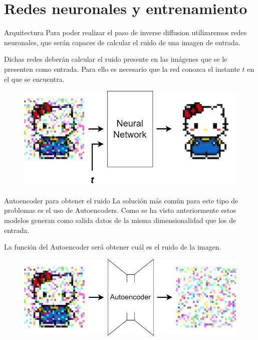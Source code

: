 \section{Redes neuronales y entrenamiento}

\begin{frame}{Arquitectura}
Para poder realizar el paso de \alert{inverse diffusion} utilizaremos redes neuronales, que serán capaces de calcular el \alert{ruido} de una imagen de entrada.

Dichas redes deberán calcular el \alert{ruido} presente en las imágenes que se le presenten como entrada. Para ello es necesario que la red conozca el instante \alert{$t$} en el que se encuentra.

\begin{figure}
    \centering
    \includegraphics[width=\textwidth]{figures/Diffusion_Models/Architecture.png}
\end{figure}
\end{frame}

\begin{frame}{Autoencoder para obtener el ruido}
La solución más común para este tipo de problemas es el uso de \alert{Autoencoders}. Como se ha visto anteriormente estos modelos generan como salida datos de la misma \alert{dimensionalidad} que los de entrada.

La función del Autoencoder será obtener cuál es el \alert{ruido} de la imagen.

\begin{figure}
    \centering
    \includegraphics[width=\textwidth]{figures/Diffusion_Models/Autoencoder_Denoising.png}
\end{figure}
\end{frame}

